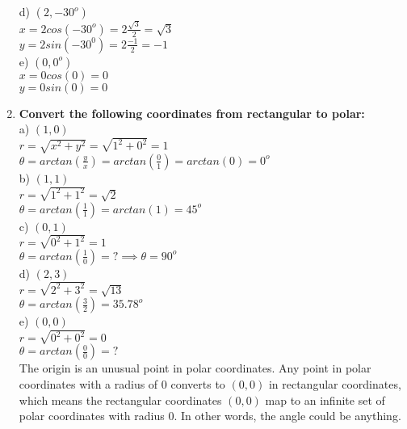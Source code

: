 \begin{enumerate}
\tab d) $(2,-30^o)$\\

\tab \tab $x = 2 cos(-30^o) = 2 \frac{\sqrt{3}}{2} = \sqrt{3}$\\

\tab \tab $y = 2 sin(-30^0) = 2 \frac{-1}{2} = -1$\\

\tab e) $(0,0^o)$\\

\tab \tab $x = 0 cos(0) = 0$\\

\tab \tab $y = 0 sin(0) = 0$\\


\item{\bf Convert the following coordinates from rectangular to polar:}\\

\tab a) $(1,0)$\\

\tab \tab $r = \sqrt{x^2 + y^2} = \sqrt{1^2 + 0^2} = 1$\\

\tab \tab $\theta = arctan(\frac{y}{x}) = arctan(\frac{0}{1}) = arctan(0) = 0^o$\\

\tab b) $(1,1)$\\

\tab \tab $r = \sqrt{1^2 + 1^2} = \sqrt{2}$\\

\tab \tab $\theta = arctan(\frac{1}{1}) = arctan(1) = 45^o$\\

\tab c) $(0,1)$\\

\tab \tab $r = \sqrt{0^2 + 1^2} = 1$\\

\tab \tab $\theta = arctan(\frac{1}{0}) = ? \implies \theta = 90^o$\\

\tab d) $(2,3)$\\

\tab \tab $r = \sqrt{2^2 + 3^2} = \sqrt{13}$\\

\tab \tab $\theta = arctan(\frac{3}{2})  = 35.78^o$\\

\tab e) $(0,0)$\\

\tab \tab $r = \sqrt{0^2 + 0^2} = 0$\\

\tab \tab $\theta = arctan(\frac{0}{0}) = ?$\\

\tab \tab The origin is an unusual point in polar coordinates.  Any point in polar coordinates with a radius of $0$ converts to $(0,0)$ in rectangular coordinates, which means the rectangular coordinates $(0,0)$ map to an infinite set of polar coordinates with radius 0.  In other words, the angle could be anything.\\

\end{enumerate}


